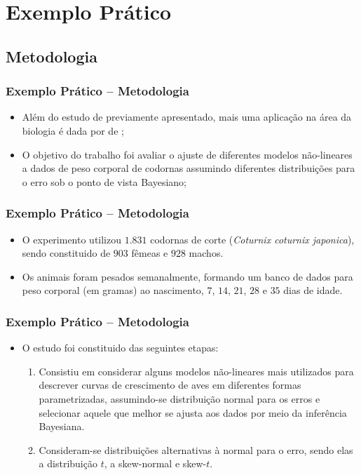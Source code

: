 \documentclass[13pt, aspectratio=169]{beamer}
\begin{document}
\section{Exemplo Prático}

\subsection{Metodologia}

\begin{frame}
    \frametitle{Exemplo Prático -- Metodologia}
    \begin{itemize}
        \item Além do estudo  de \textcite{campos2010ajuste} previamente apresentado, mais uma aplicação na área da biologia é dada por  de \textcite{rossi2014modelagem};
        \pause
        \item O objetivo do trabalho foi avaliar o ajuste de diferentes modelos não-lineares a dados de peso corporal de codornas assumindo diferentes distribuições para o erro sob o ponto de vista Bayesiano;
    \end{itemize}

\end{frame}

\begin{frame}
    \frametitle{Exemplo Prático -- Metodologia}

    \begin{itemize}
        \item O experimento utilizou $1.831$ codornas de corte (\textit{Coturnix coturnix japonica}), sendo constituido de $903$ fêmeas e $928$ machos.
        \pause
        \item Os animais foram pesados semanalmente, formando um banco de dados para peso corporal (em gramas) ao nascimento, $7$, $14$, $21$, $28$ e $35$ dias de idade.
    \end{itemize}

\end{frame}

\begin{frame}
    \frametitle{Exemplo Prático -- Metodologia}

    \begin{itemize}
        \item O estudo foi constituido das seguintes etapas:
           \begin{enumerate}
                \item Consistiu em considerar alguns modelos não-lineares mais utilizados para descrever curvas de crescimento de aves em diferentes formas parametrizadas, assumindo-se distribuição normal para os erros e selecionar aquele que melhor se ajusta aos dados por meio da inferência Bayesiana.
                \pause
                \item Consideram-se distribuições alternativas à normal para o erro, sendo elas a distribuição $t$, a skew-normal e skew-$t$. 
            \end{enumerate}
    \end{itemize}

\end{frame}
\end{document}
